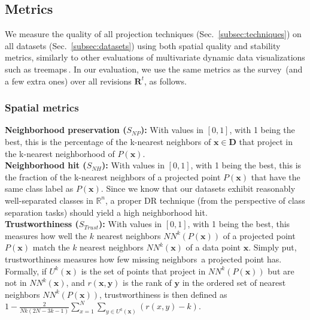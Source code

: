 \vspace{-0.15cm}
\subsection{Metrics}
\label{subsec:metrics}
%
We measure the quality of all projection techniques (Sec.~\ref{subsec:techniques}) on all datasets (Sec.~\ref{subsec:datasets}) using both spatial quality and stability metrics, similarly to other evaluations of multivariate dynamic data visualizations such as treemaps\,\citep{sondag17,vernier18git,vernier18software}. In our evaluation, we use the same metrics as the survey\,\citep{Espadoto19} (and a few extra ones) over all revisions $\mathbf{R}^t$, as follows.


\subsubsection{Spatial metrics}
\label{sec:spatial-4}
%
\noindent
\textbf{Neighborhood preservation ($S_{NP}$):} With values in $[0,1]$, with 1 being the best, this is the percentage of the k-nearest neighbors of $\mathbf{x} \in \mathbf{D}$ that project in the k-nearest neighborhood of $P(\mathbf{x})$.\\

\noindent
\textbf{Neighborhood hit ($S_{NH}$):} With values in $[0,1]$, with 1 being the best, this is the fraction of the k-nearest neighbors of a projected point $P(\mathbf{x})$ that have the same class label as $P(\mathbf{x})$. Since we know that our datasets exhibit reasonably well-separated classes in $\mathbb{R}^n$, a proper DR technique (from the perspective of class separation tasks) should yield a high neighborhood hit.\\

\noindent
\textbf{Trustworthiness ($S_{Trust}$):} With values in $[0,1]$, with 1 being the best, this measures how well the $k$ nearest neighbors $NN^k(P(\mathbf{x}))$ of a projected point $P(\mathbf{x})$ match the $k$ nearest neighbors $NN^k(\mathbf{x})$ of a data point $\mathbf{x}$. Simply put, trustworthiness measures how few missing neighbors\,\citep{Martins2014} a projected point has. Formally, if $U^k(\mathbf{x})$ is the set of points that project in $NN^k(P(\mathbf{x}))$ but are not in $NN^k(\mathbf{x})$,
and $r(\mathbf{x},\mathbf{y})$ is the rank of $\mathbf{y}$ in the ordered set of nearest neighbors $NN^k(P(\mathbf{x}))$, trustworthiness is then defined as \linebreak
$1-\frac{2}{N k(2 N-3 k-1)} \sum_{x=1}^{N} \sum_{y \in U^k(\mathbf{x})}(r(x, y)-k)$.\\

